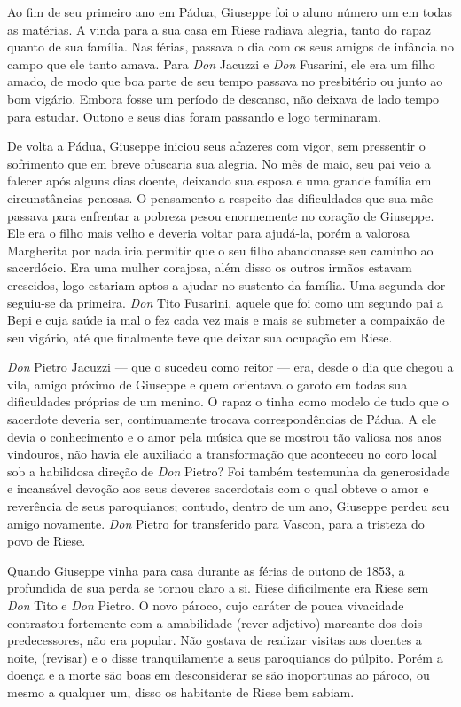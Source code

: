 \documentclass[12pt,a4paper,oneside]{book}
\begin{document}
\quad Ao fim de seu primeiro ano em Pádua, Giuseppe foi o aluno número um em todas as matérias. A vinda para a sua casa em Riese radiava alegria, tanto do rapaz quanto de sua família. Nas férias, passava o dia com os seus amigos de infância no campo que ele tanto amava. Para \emph{Don} Jacuzzi e \emph{Don} Fusarini, ele era um filho amado, de modo que boa parte de seu tempo passava no presbitério ou junto ao bom vigário. Embora fosse um período de descanso, não deixava de lado tempo para estudar. Outono e seus dias foram passando e logo terminaram.

\quad De volta a Pádua, Giuseppe iniciou seus afazeres com vigor, sem pressentir o sofrimento que em breve ofuscaria sua alegria. No mês de maio, seu pai veio a falecer após alguns dias doente, deixando sua esposa e uma grande família em circunstâncias penosas. O pensamento a respeito das dificuldades que sua mãe passava para enfrentar a pobreza pesou enormemente no coração de Giuseppe. Ele era o filho mais velho e deveria voltar para ajudá-la, porém a valorosa Margherita por nada iria permitir que o seu filho abandonasse seu caminho ao sacerdócio. Era uma mulher corajosa, além disso os outros irmãos estavam crescidos, logo estariam aptos a ajudar no sustento da família. Uma segunda dor seguiu-se da primeira. \emph{Don} Tito Fusarini, aquele que foi como um segundo pai a Bepi e cuja saúde ia mal o fez cada vez mais e mais se submeter a compaixão de seu vigário, até que finalmente teve que deixar sua ocupação em Riese.

\quad \emph{Don} Pietro Jacuzzi --- que o sucedeu como reitor --- era, desde o dia que chegou a vila, amigo próximo de Giuseppe e quem orientava o garoto em todas sua dificuldades próprias de um menino. O rapaz o tinha como modelo de tudo que o sacerdote deveria ser, continuamente trocava correspondências de Pádua. A ele devia o conhecimento e o amor pela música que se mostrou tão valiosa nos anos vindouros, não havia ele auxiliado a transformação que aconteceu no coro local sob a habilidosa direção de \emph{Don} Pietro? Foi também testemunha da generosidade e incansável devoção aos seus deveres sacerdotais com o qual obteve o amor e reverência de seus paroquianos; contudo, dentro de um ano, Giuseppe perdeu seu amigo novamente. \emph{Don} Pietro for transferido para Vascon, para a tristeza do povo de Riese.

\quad Quando Giuseppe vinha para casa durante as férias de outono de 1853, a profundida de sua perda se tornou claro a si. Riese dificilmente era Riese sem \emph{Don} Tito e \emph{Don} Pietro. O novo pároco, cujo caráter de pouca vivacidade contrastou fortemente com a amabilidade (rever adjetivo) marcante dos dois predecessores, não era popular. Não gostava de realizar visitas aos doentes a noite, (revisar) e o disse tranquilamente a seus paroquianos do púlpito. Porém a doença e a morte são boas em desconsiderar se são inoportunas ao pároco, ou mesmo a qualquer um, disso os habitante de Riese bem sabiam.
\end{document}
